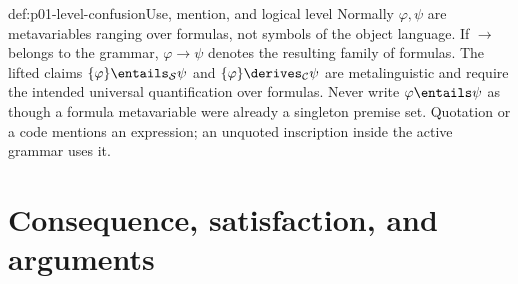 \begin{hbwarning}{def:p01-level-confusion}{Use, mention, and logical level}
Normally \(\varphi,\psi\) are metavariables ranging over formulas, not
symbols of the object language.  If \(\to\) belongs to the grammar,
\(\varphi\to\psi\) denotes the resulting family of formulas.  The lifted
claims \(\{\varphi\}\entails_{\mathcal S}\psi\) and
\(\{\varphi\}\derives_{\mathcal C}\psi\) are metalinguistic and require
the intended universal quantification over formulas.  Never write
\(\varphi\entails\psi\) as though a formula metavariable were already a
singleton premise set.  Quotation or a code mentions an expression; an
unquoted inscription inside the active grammar uses it.
\end{hbwarning}

\section{Consequence, satisfaction, and arguments}
\label{sec:p01-consequence-vocabulary}

